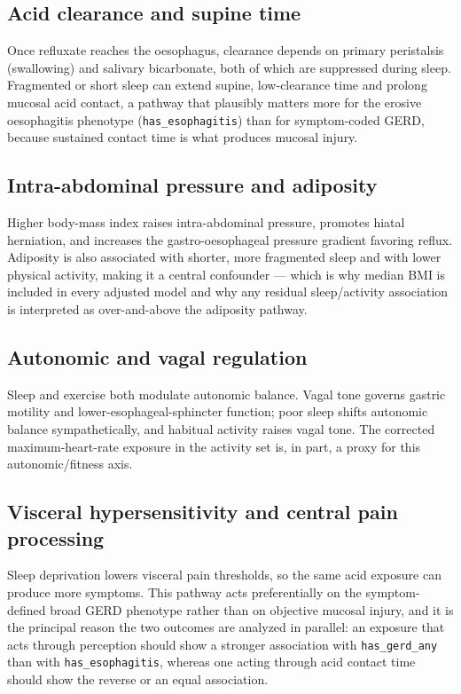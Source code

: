 \documentclass[11pt]{article}
\newcommand{\code}[1]{\texttt{\small #1}}
\begin{document}
\subsection{Acid clearance and supine time}
Once refluxate reaches the oesophagus, clearance depends on primary peristalsis (swallowing) and
salivary bicarbonate, both of which are suppressed during sleep. Fragmented or short sleep can extend
supine, low-clearance time and prolong mucosal acid contact, a pathway that plausibly matters more for
the erosive oesophagitis phenotype (\code{has_esophagitis}) than for symptom-coded GERD, because
sustained contact time is what produces mucosal injury.

\subsection{Intra-abdominal pressure and adiposity}
Higher body-mass index raises intra-abdominal pressure, promotes hiatal herniation, and increases the
gastro-oesophageal pressure gradient favoring reflux. Adiposity is also associated with shorter,
more fragmented sleep and with lower physical activity, making it a central confounder --- which is why
median BMI is included in every adjusted model and why any residual sleep/activity association is
interpreted as over-and-above the adiposity pathway.

\subsection{Autonomic and vagal regulation}
Sleep and exercise both modulate autonomic balance. Vagal tone governs gastric motility and
lower-esophageal-sphincter function; poor sleep shifts autonomic balance sympathetically, and habitual
activity raises vagal tone. The corrected maximum-heart-rate exposure in the activity set is, in part, a
proxy for this autonomic/fitness axis.

\subsection{Visceral hypersensitivity and central pain processing}
Sleep deprivation lowers visceral pain thresholds, so the same acid exposure can produce more symptoms.
This pathway acts preferentially on the symptom-defined broad GERD phenotype rather than on objective
mucosal injury, and it is the principal reason the two outcomes are analyzed in parallel: an exposure
that acts through perception should show a stronger association with \code{has_gerd_any} than with
\code{has_esophagitis}, whereas one acting through acid contact time should show the reverse or an equal
association.
\end{document}
